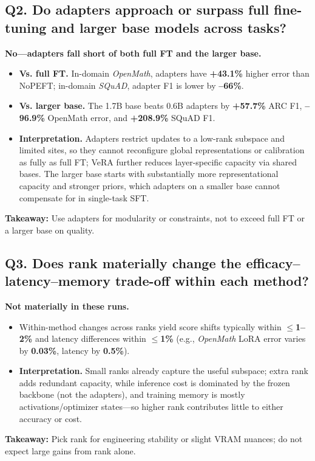 \documentclass[11pt,a4paper]{article}
\begin{document}
\subsection*{Q2. Do adapters approach or surpass full fine-tuning and larger base models across tasks?}
\textbf{No—adapters fall short of both full FT and the larger base.}
\begin{itemize}
  \item \textbf{Vs. full FT.} In-domain \textit{OpenMath}, adapters have \textbf{+43.1\%} higher error than NoPEFT; in-domain \textit{SQuAD}, adapter F1 is lower by \textbf{--66\%}.
  \item \textbf{Vs. larger base.} The 1.7B base beats 0.6B adapters by \textbf{+57.7\%} ARC F1, \textbf{--96.9\%} OpenMath error, and \textbf{+208.9\%} SQuAD F1.
  \item \textbf{Interpretation.} Adapters restrict updates to a low-rank subspace and limited sites, so they cannot reconfigure global representations or calibration as fully as full FT; VeRA further reduces layer-specific capacity via shared bases. The larger base starts with substantially more representational capacity and stronger priors, which adapters on a smaller base cannot compensate for in single-task SFT.
\end{itemize}
\textbf{Takeaway:} Use adapters for modularity or constraints, not to exceed full FT or a larger base on quality.

\subsection*{Q3. Does rank materially change the efficacy–latency–memory trade-off within each method?}
\textbf{Not materially in these runs.}
\begin{itemize}
  \item Within-method changes across ranks yield score shifts typically within \textbf{$\leq$1–2\%} and latency differences within \textbf{$\leq$1\%} (e.g., \textit{OpenMath} LoRA error varies by \textbf{0.03\%}, latency by \textbf{0.5\%}).
  \item \textbf{Interpretation.} Small ranks already capture the useful subspace; extra rank adds redundant capacity, while inference cost is dominated by the frozen backbone (not the adapters), and training memory is mostly activations/optimizer states—so higher rank contributes little to either accuracy or cost.
\end{itemize}
\textbf{Takeaway:} Pick rank for engineering stability or slight VRAM nuances; do not expect large gains from rank alone.
\end{document}
